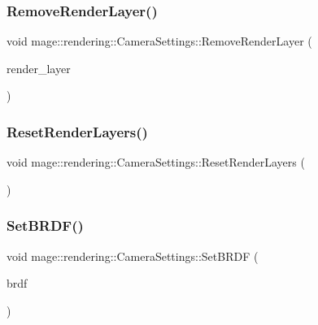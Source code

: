 \subsubsection{\texorpdfstring{Remove\+Render\+Layer()}{RemoveRenderLayer()}}
{\footnotesize\ttfamily void mage\+::rendering\+::\+Camera\+Settings\+::\+Remove\+Render\+Layer (\begin{DoxyParamCaption}\item[{\mbox{\hyperlink{namespacemage_1_1rendering_a466c2a441ea5b26e4625c2f34e021b3d}{Render\+Layer}}}]{render\+\_\+layer }\end{DoxyParamCaption})\hspace{0.3cm}{\ttfamily [noexcept]}}

\mbox{\label{classmage_1_1rendering_1_1_camera_settings_a954a0af8d7939069e32b77abc23f95d0}} 
\subsubsection{\texorpdfstring{Reset\+Render\+Layers()}{ResetRenderLayers()}}
{\footnotesize\ttfamily void mage\+::rendering\+::\+Camera\+Settings\+::\+Reset\+Render\+Layers (\begin{DoxyParamCaption}{ }\end{DoxyParamCaption})\hspace{0.3cm}{\ttfamily [noexcept]}}

\mbox{\label{classmage_1_1rendering_1_1_camera_settings_af2af3e55e876b0e2b037904e221f0bc4}} 
\subsubsection{\texorpdfstring{Set\+B\+R\+D\+F()}{SetBRDF()}}
{\footnotesize\ttfamily void mage\+::rendering\+::\+Camera\+Settings\+::\+Set\+B\+R\+DF (\begin{DoxyParamCaption}\item[{\mbox{\hyperlink{namespacemage_1_1rendering_ab8fe8684ca4bd74ba3a394b00cf125b5}{B\+R\+DF}}}]{brdf }\end{DoxyParamCaption})\hspace{0.3cm}{\ttfamily [noexcept]}}

